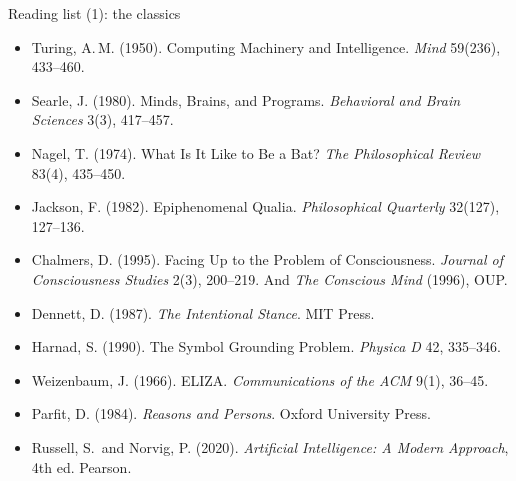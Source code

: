 \begin{frame}{Reading list (1): the classics}
\footnotesize
\begin{itemize}\setlength\itemsep{3pt}
\item Turing, A.\,M. (1950). Computing Machinery and Intelligence. \emph{Mind} 59(236), 433--460.
\item Searle, J. (1980). Minds, Brains, and Programs. \emph{Behavioral and Brain Sciences} 3(3), 417--457.
\item Nagel, T. (1974). What Is It Like to Be a Bat? \emph{The Philosophical Review} 83(4), 435--450.
\item Jackson, F. (1982). Epiphenomenal Qualia. \emph{Philosophical Quarterly} 32(127), 127--136.
\item Chalmers, D. (1995). Facing Up to the Problem of Consciousness. \emph{Journal of Consciousness Studies} 2(3), 200--219. And \emph{The Conscious Mind} (1996), OUP.
\item Dennett, D. (1987). \emph{The Intentional Stance}. MIT Press.
\item Harnad, S. (1990). The Symbol Grounding Problem. \emph{Physica D} 42, 335--346.
\item Weizenbaum, J. (1966). ELIZA. \emph{Communications of the ACM} 9(1), 36--45.
\item Parfit, D. (1984). \emph{Reasons and Persons}. Oxford University Press.
\item Russell, S.\ and Norvig, P. (2020). \emph{Artificial Intelligence: A Modern Approach}, 4th ed. Pearson.
\end{itemize}
\end{frame}

